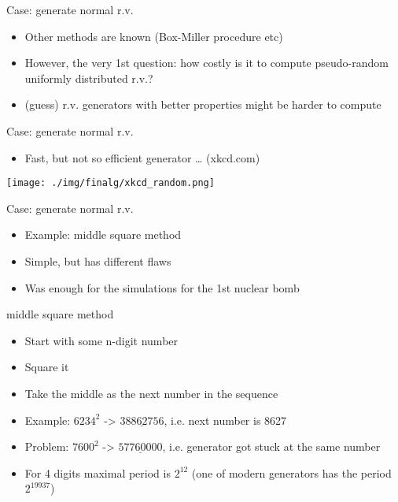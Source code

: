 \documentclass[presentation]{beamer}
\begin{document}
\begin{frame}[label=sec-3-4]{Case: generate normal r.v.}
\begin{itemize}
\item Other methods are known (Box-Miller procedure etc)
\item However, the very 1st question: how costly is it to compute pseudo-random uniformly distributed r.v.?
\item (guess) r.v. generators with better properties might be harder to compute
\end{itemize}
\end{frame}
\begin{frame}[label=sec-3-5]{Case: generate normal r.v.}
\begin{itemize}
\item Fast, but not so efficient generator \ldots{} (xkcd.com)
\end{itemize}
\texttt{[image: ./img/finalg/xkcd\_random.png]}
\end{frame}
\begin{frame}[label=sec-3-6]{Case: generate normal r.v.}
\begin{itemize}
\item Example: middle square method
\item Simple, but has different flaws
\item Was enough for the simulations for the 1st nuclear bomb
\end{itemize}
\begin{block}{middle square method}
\begin{itemize}
\item Start with some n-digit number
\item Square it
\item Take the middle as the next number in the sequence
\item Example: $6234^2$ -> $38\underline{8627}56$, i.e. next number is 8627
\item Problem: $7600^2$ -> $57\underline{7600}00$, i.e. generator got stuck at the same number
\item For 4 digits maximal period is $2^{12}$ (one of modern generators has the period $2^{19937}$)
\end{itemize}
\end{block}
\end{frame}
\end{document}

